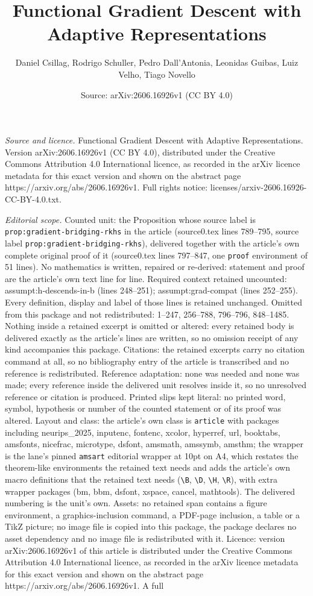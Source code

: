 \documentclass[10pt,a4paper]{amsart}
\title[Functional Gradient Descent with Adaptive Representations]{Functional Gradient Descent with Adaptive Representations}
\author{Daniel Csillag, Rodrigo Schuller, Pedro Dall'Antonia, Leonidas Guibas, Luiz Velho, Tiago Novello}
\date{Source: arXiv:2606.16926v1 (CC BY 4.0)}
\begin{document}
\maketitle

\noindent\emph{Source and licence.} Functional Gradient Descent with Adaptive Representations. Version arXiv:2606.16926v1 (CC BY 4.0), distributed under the Creative Commons Attribution 4.0 International licence, as recorded in the arXiv licence metadata for this exact version and shown on the abstract page https://arxiv.org/abs/2606.16926v1. Full rights notice: licenses/arxiv-2606.16926-CC-BY-4.0.txt.\par\smallskip

\noindent\textit{Editorial scope.} Counted unit: the Proposition whose source label is \texttt{prop:gradient-bridging-rkhs} in the article (source0.tex lines 789--795, source label \texttt{prop:gradient-bridging-rkhs}), delivered together with the article's own complete original proof of it (source0.tex lines 797--847, one \texttt{proof} environment of 51 lines). No mathematics is written, repaired or re-derived: statement and proof are the article's own text line for line. Required context retained uncounted: assumpt:h-descends-in-b (lines 248--251); assumpt:grad-compat (lines 252--255). Every definition, display and label of those lines is retained unchanged. Omitted from this package and not redistributed: 1--247, 256--788, 796--796, 848--1485. Nothing inside a retained excerpt is omitted or altered: every retained body is delivered exactly as the article's lines are written, so no omission receipt of any kind accompanies this package. Citations: the retained excerpts carry no citation command at all, so no bibliography entry of the article is transcribed and no reference is redistributed. Reference adaptation: none was needed and none was made; every reference inside the delivered unit resolves inside it, so no unresolved reference or citation is produced. Printed slips kept literal: no printed word, symbol, hypothesis or number of the counted statement or of its proof was altered. Layout and class: the article's own class is \texttt{article} with packages including neurips\_2025, inputenc, fontenc, xcolor, hyperref, url, booktabs, amsfonts, nicefrac, microtype, dsfont, amsmath, amssymb, amsthm; the wrapper is the lane's pinned \texttt{amsart} editorial wrapper at 10pt on A4, which restates the theorem-like environments the retained text needs and adds the article's own macro definitions that the retained text needs (\texttt{\textbackslash B}, \texttt{\textbackslash D}, \texttt{\textbackslash H}, \texttt{\textbackslash R}), with extra wrapper packages (bm, bbm, dsfont, xspace, cancel, mathtools). The delivered numbering is the unit's own. Assets: no retained span contains a figure environment, a graphics-inclusion command, a PDF-page inclusion, a table or a TikZ picture; no image file is copied into this package, the package declares no asset dependency and no image file is redistributed with it. Licence: version arXiv:2606.16926v1 of this article is distributed under the Creative Commons Attribution 4.0 International licence, as recorded in the arXiv licence metadata for this exact version and shown on the abstract page https://arxiv.org/abs/2606.16926v1. A full 
\end{document}
